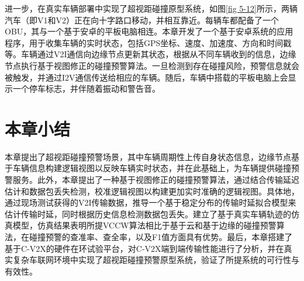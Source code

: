 进一步，在真实车辆部署中实现了超视距碰撞原型系统，如图\ref{fig 5-12}所示，两辆汽车（即V1和V2）正在向十字路口移动，并相互靠近。每辆车都配备了一个OBU，其与一个基于安卓的平板电脑相连。本章开发了一个基于安卓系统的应用程序，用于收集车辆的实时状态，包括GPS坐标、速度、加速度、方向和时间戳等。车辆通过V2I通信向边缘节点更新其状态，根据从不同车辆收到的信息，边缘节点执行基于视图修正的碰撞预警算法。一旦检测到存在碰撞风险，预警信息就会被触发，并通过I2V通信传送给相应的车辆。随后，车辆中搭载的平板电脑上会显示一个停车标志，并伴随着振动和警告音。

\section{本章小结}\label{section 5-6}

本章提出了超视距碰撞预警场景，其中车辆周期性上传自身状态信息，边缘节点基于车辆信息构建逻辑视图以反映车辆实时状态，并在此基础上，为车辆提供碰撞预警服务。此外，本章提出了一种基于视图修正的碰撞预警算法，通过结合传输延迟估计和数据包丢失检测，校准逻辑视图以构建更加实时准确的逻辑视图。具体地，通过现场测试获得的V2I传输数据，推导一个基于稳定分布的传输时延拟合模型来估计传输时延，同时根据历史信息检测数据包丢失。建立了基于真实车辆轨迹的仿真模型，仿真结果表明所提VCCW算法相比于基于云和基于边缘的碰撞预警算法，在碰撞预警的查准率、查全率，以及F1值方面具有优势。最后，本章搭建了基于C-V2X的硬件在环试验平台，对C-V2X端到端传输性能进行了分析，并在真实复杂车联网环境中实现了超视距碰撞预警原型系统，验证了所提系统的可行性与有效性。

